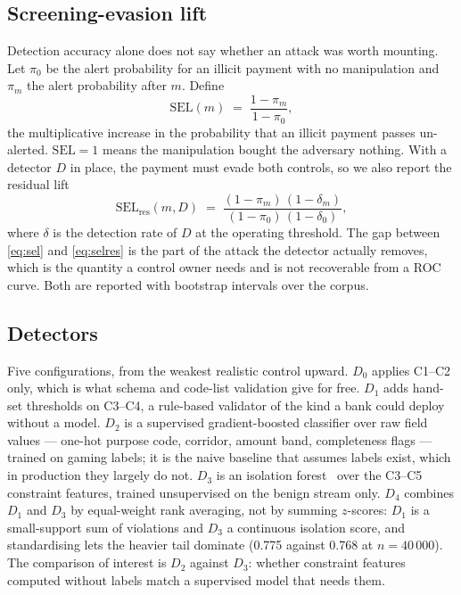 \documentclass[conference]{IEEEtran}
\begin{document}
\subsection{Screening-evasion lift}
Detection accuracy alone does not say whether an attack was worth mounting.
Let $\pi_0$ be the alert probability for an illicit payment with no
manipulation and $\pi_m$ the alert probability after $m$. Define
\begin{equation}
\mathrm{SEL}(m) \;=\; \frac{1-\pi_m}{1-\pi_0},
\label{eq:sel}
\end{equation}
the multiplicative increase in the probability that an illicit payment passes
un-alerted. $\mathrm{SEL}=1$ means the manipulation bought the adversary
nothing. With a detector $D$ in place, the payment must evade both controls,
so we also report the residual lift
\begin{equation}
\mathrm{SEL_{res}}(m,D) \;=\;
\frac{(1-\pi_m)\,(1-\delta_m)}{(1-\pi_0)\,(1-\delta_0)},
\label{eq:selres}
\end{equation}
where $\delta$ is the detection rate of $D$ at the operating threshold. The
gap between \eqref{eq:sel} and \eqref{eq:selres} is the part of the attack the
detector actually removes, which is the quantity a control owner needs and is
not recoverable from a ROC curve. Both are reported with bootstrap intervals
over the corpus.

\subsection{Detectors}
Five configurations, from the weakest realistic control upward.
$D_0$ applies C1--C2 only, which is what schema and code-list validation give
for free. $D_1$ adds hand-set thresholds on C3--C4, a rule-based validator of
the kind a bank could deploy without a model. $D_2$ is a supervised
gradient-boosted classifier over raw field values --- one-hot purpose code, corridor,
amount band, completeness flags --- trained on gaming labels; it is the naive
baseline that assumes labels exist, which in production they largely do not.
$D_3$ is an isolation forest~\cite{liu2008} over the C3--C5 constraint
features, trained unsupervised on the benign stream only. $D_4$ combines
$D_1$ and $D_3$ by equal-weight rank averaging, not by summing $z$-scores:
$D_1$ is a small-support sum of violations and $D_3$ a continuous isolation
score, and standardising lets the heavier tail dominate (0.775 against 0.768
at $n=40\,000$). The comparison of interest is
$D_2$ against $D_3$: whether constraint features computed without labels match
a supervised model that needs them.
\end{document}
